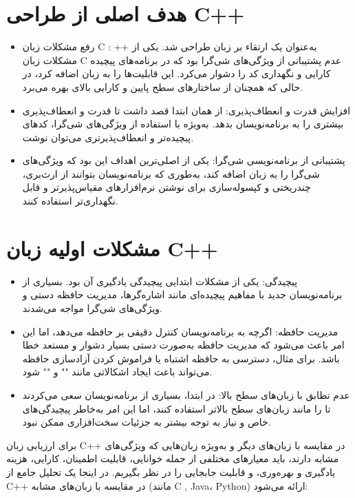 \documentclass[12pt, a4paper]{report}
\begin{document}
\section{هدف اصلی از طراحی C++}
\begin{itemize}
	\item
رفع مشکلات زبان C : ++ به‌عنوان یک ارتقاء بر زبان  طراحی شد. یکی از مشکلات زبان C عدم پشتیبانی از ویژگی‌های شی‌گرا بود که در برنامه‌های پیچیده کارایی و نگهداری کد را دشوار می‌کرد.  این قابلیت‌ها را به زبان اضافه کرد، در حالی که همچنان از ساختارهای سطح پایین و کارایی بالای  بهره می‌برد.
\item
افزایش قدرت و انعطاف‌پذیری:  از همان ابتدا قصد داشت تا قدرت و انعطاف‌پذیری بیشتری را به برنامه‌نویسان بدهد. به‌ویژه با استفاده از ویژگی‌های شی‌گرا، کدهای پیچیده‌تر و انعطاف‌پذیرتری می‌توان نوشت.
\item
پشتیبانی از برنامه‌نویسی شی‌گرا: یکی از اصلی‌ترین اهداف  این بود که ویژگی‌های شی‌گرا را به زبان  اضافه کند، به‌طوری که برنامه‌نویسان بتوانند از ارث‌بری، چندریختی و کپسوله‌سازی برای نوشتن نرم‌افزارهای مقیاس‌پذیرتر و قابل نگهداری‌تر استفاده کنند.
\end{itemize}
\section{ مشکلات اولیه زبان C++}
\begin{itemize}
	\item
پیچیدگی: یکی از مشکلات ابتدایی  پیچیدگی یادگیری آن بود. بسیاری از برنامه‌نویسان جدید با مفاهیم پیچیده‌ای مانند اشاره‌گرها، مدیریت حافظه دستی و ویژگی‌های شی‌گرا مواجه می‌شدند.
\item 
مدیریت حافظه: اگرچه  به برنامه‌نویسان کنترل دقیقی بر حافظه می‌دهد، اما این امر باعث می‌شود که مدیریت حافظه به‌صورت دستی بسیار دشوار و مستعد خطا باشد. برای مثال، دسترسی به حافظه اشتباه یا فراموش کردن آزادسازی حافظه می‌تواند باعث ایجاد اشکالاتی مانند "" و "" شود.
\item 
عدم تطابق با زبان‌های سطح بالا: در ابتدا، بسیاری از برنامه‌نویسان سعی می‌کردند تا  را مانند زبان‌های سطح بالاتر استفاده کنند، اما این امر به‌خاطر پیچیدگی‌های خاص و نیاز به توجه بیشتر به جزئیات سخت‌افزاری ممکن نبود.
\end{itemize}



برای ارزیابی زبان C++ در مقایسه با زبان‌های دیگر و به‌ویژه زبان‌هایی که ویژگی‌های مشابه دارند، باید معیارهای مختلفی از جمله خوانایی، قابلیت اطمینان، کارایی، هزینه یادگیری و بهره‌وری، و قابلیت جابجایی را در نظر بگیریم. در اینجا یک تحلیل جامع از C++ در مقایسه با زبان‌های مشابه (مانند C , Java، Python) ارائه می‌شود:
\end{document}
